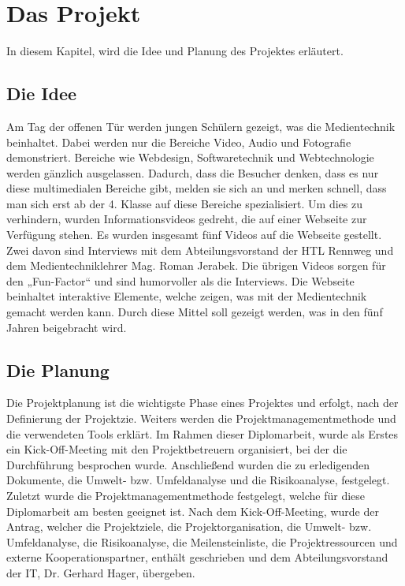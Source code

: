 \chapter{Das Projekt}

In diesem Kapitel, wird die Idee und Planung des Projektes erläutert. 

\section{Die Idee}
Am Tag der offenen Tür werden jungen Schülern gezeigt, was die Medientechnik beinhaltet. Dabei werden nur die Bereiche Video, Audio und Fotografie demonstriert. Bereiche wie Webdesign, Softwaretechnik und Webtechnologie werden gänzlich ausgelassen. Dadurch, dass die Besucher denken, dass es nur diese multimedialen Bereiche gibt, melden sie sich an und merken schnell, dass man sich erst ab der 4. Klasse auf diese Bereiche spezialisiert. Um dies zu verhindern, wurden Informationsvideos gedreht, die auf einer Webseite zur Verfügung stehen. Es wurden insgesamt fünf Videos auf die Webseite gestellt. Zwei davon sind Interviews mit dem Abteilungsvorstand der HTL Rennweg und dem Medientechniklehrer Mag. Roman Jerabek. Die übrigen Videos sorgen für den „Fun-Factor“ und sind humorvoller als die Interviews. Die Webseite beinhaltet interaktive Elemente, welche zeigen, was mit der Medientechnik gemacht werden kann. Durch diese Mittel soll gezeigt werden, was in den fünf Jahren beigebracht wird.

\section{Die Planung}
Die Projektplanung ist die wichtigste Phase eines Projektes und erfolgt, nach der Definierung der Projektzie.\cite{pmplanung} Weiters werden die Projektmanagementmethode und die verwendeten Tools erklärt. Im Rahmen dieser Diplomarbeit, wurde als Erstes ein Kick-Off-Meeting mit den Projektbetreuern organisiert, bei der die Durchführung besprochen wurde. Anschließend wurden die zu erledigenden Dokumente, die Umwelt- bzw. Umfeldanalyse und die Risikoanalyse, festgelegt. Zuletzt wurde die Projektmanagementmethode festgelegt, welche für diese Diplomarbeit am besten geeignet ist. Nach dem Kick-Off-Meeting, wurde der Antrag, welcher die Projektziele, die Projektorganisation, die Umwelt- bzw. Umfeldanalyse, die Risikoanalyse, die Meilensteinliste, die Projektressourcen und externe Kooperationspartner, enthält geschrieben und dem Abteilungsvorstand der IT, Dr. Gerhard Hager, übergeben.

